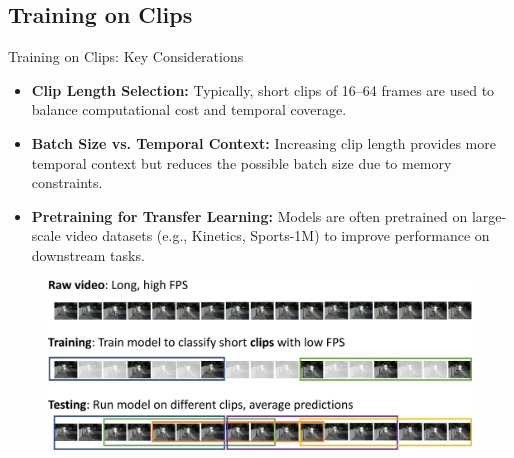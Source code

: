 \subsection{Training on Clips}

\begin{frame}[allowframebreaks]{Training on Clips: Key Considerations}
    \begin{itemize}
        \item \textbf{Clip Length Selection:} Typically, short clips of 16--64 frames are used to balance computational cost and temporal coverage.
        \item \textbf{Batch Size vs. Temporal Context:} Increasing clip length provides more temporal context but reduces the possible batch size due to memory constraints.
        \item \textbf{Pretraining for Transfer Learning:} Models are often pretrained on large-scale video datasets (e.g., Kinetics, Sports-1M) to improve performance on downstream tasks.
    \end{itemize}
\framebreak
    \begin{figure}
        \centering
        \includegraphics[width=1\textwidth,height=0.9\textheight,keepaspectratio]{images/video/slide_8_1_img.jpg}
    \end{figure}
\end{frame}